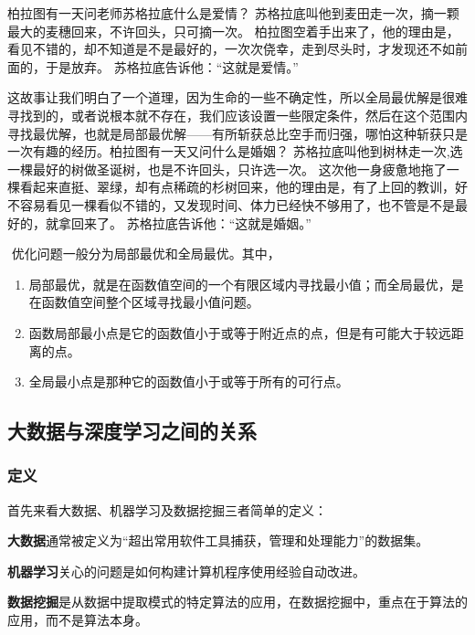 柏拉图有一天问老师苏格拉底什么是爱情？
苏格拉底叫他到麦田走一次，摘一颗最大的麦穗回来，不许回头，只可摘一次。
柏拉图空着手出来了，他的理由是，看见不错的，却不知道是不是最好的，一次次侥幸，走到尽头时，才发现还不如前面的，于是放弃。
苏格拉底告诉他：``这就是爱情。''

这故事让我们明白了一个道理，因为生命的一些不确定性，所以全局最优解是很难寻找到的，或者说根本就不存在，我们应该设置一些限定条件，然后在这个范围内寻找最优解，也就是局部最优解------有所斩获总比空手而归强，哪怕这种斩获只是一次有趣的经历。
​
柏拉图有一天又问什么是婚姻？
苏格拉底叫他到树林走一次,选一棵最好的树做圣诞树，也是不许回头，只许选一次。
这次他一身疲惫地拖了一棵看起来直挺、翠绿，却有点稀疏的杉树回来，他的理由是，有了上回的教训，好不容易看见一棵看似不错的，又发现时间、体力已经快不够用了，也不管是不是最好的，就拿回来了。
苏格拉底告诉他：``这就是婚姻。''

​ 优化问题一般分为局部最优和全局最优。其中，
\begin{enumerate}
\item 局部最优，就是在函数值空间的一个有限区域内寻找最小值；而全局最优，是在函数值空间整个区域寻找最小值问题。
\item 函数局部最小点是它的函数值小于或等于附近点的点，但是有可能大于较远距离的点。
\item 全局最小点是那种它的函数值小于或等于所有的可行点。
\end{enumerate}
\subsection{大数据与深度学习之间的关系}
\label{ux5927ux6570ux636eux4e0eux6df1ux5ea6ux5b66ux4e60ux4e4bux95f4ux7684ux5173ux7cfb}

\subsubsection{定义}
首先来看大数据、机器学习及数据挖掘三者简单的定义：
\begin{defination}
\textbf{大数据}通常被定义为``超出常用软件工具捕获，管理和处理能力''的数据集。  
\end{defination}

\begin{defination}
\textbf{机器学习}关心的问题是如何构建计算机程序使用经验自动改进。  
\end{defination}
\begin{defination}
\textbf{数据挖掘}是从数据中提取模式的特定算法的应用，在数据挖掘中，重点在于算法的应用，而不是算法本身。  
\end{defination}

